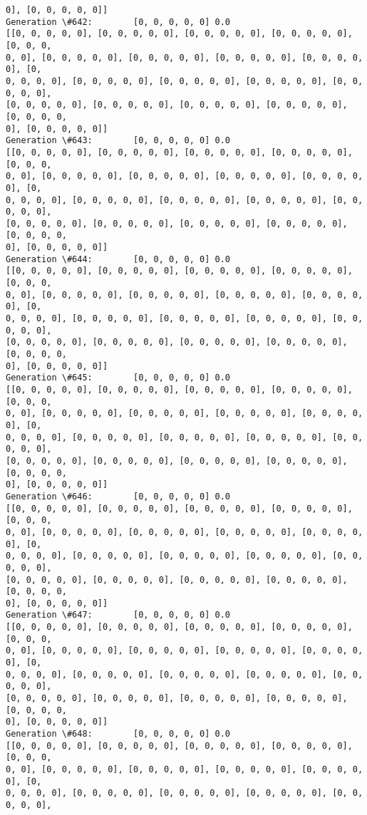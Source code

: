 \documentclass[11pt]{article}
\begin{document}
\begin{Verbatim}[commandchars=\\\{\}]
0], [0, 0, 0, 0, 0]]
Generation \#642:        [0, 0, 0, 0, 0] 0.0
[[0, 0, 0, 0, 0], [0, 0, 0, 0, 0], [0, 0, 0, 0, 0], [0, 0, 0, 0, 0], [0, 0, 0,
0, 0], [0, 0, 0, 0, 0], [0, 0, 0, 0, 0], [0, 0, 0, 0, 0], [0, 0, 0, 0, 0], [0,
0, 0, 0, 0], [0, 0, 0, 0, 0], [0, 0, 0, 0, 0], [0, 0, 0, 0, 0], [0, 0, 0, 0, 0],
[0, 0, 0, 0, 0], [0, 0, 0, 0, 0], [0, 0, 0, 0, 0], [0, 0, 0, 0, 0], [0, 0, 0, 0,
0], [0, 0, 0, 0, 0]]
Generation \#643:        [0, 0, 0, 0, 0] 0.0
[[0, 0, 0, 0, 0], [0, 0, 0, 0, 0], [0, 0, 0, 0, 0], [0, 0, 0, 0, 0], [0, 0, 0,
0, 0], [0, 0, 0, 0, 0], [0, 0, 0, 0, 0], [0, 0, 0, 0, 0], [0, 0, 0, 0, 0], [0,
0, 0, 0, 0], [0, 0, 0, 0, 0], [0, 0, 0, 0, 0], [0, 0, 0, 0, 0], [0, 0, 0, 0, 0],
[0, 0, 0, 0, 0], [0, 0, 0, 0, 0], [0, 0, 0, 0, 0], [0, 0, 0, 0, 0], [0, 0, 0, 0,
0], [0, 0, 0, 0, 0]]
Generation \#644:        [0, 0, 0, 0, 0] 0.0
[[0, 0, 0, 0, 0], [0, 0, 0, 0, 0], [0, 0, 0, 0, 0], [0, 0, 0, 0, 0], [0, 0, 0,
0, 0], [0, 0, 0, 0, 0], [0, 0, 0, 0, 0], [0, 0, 0, 0, 0], [0, 0, 0, 0, 0], [0,
0, 0, 0, 0], [0, 0, 0, 0, 0], [0, 0, 0, 0, 0], [0, 0, 0, 0, 0], [0, 0, 0, 0, 0],
[0, 0, 0, 0, 0], [0, 0, 0, 0, 0], [0, 0, 0, 0, 0], [0, 0, 0, 0, 0], [0, 0, 0, 0,
0], [0, 0, 0, 0, 0]]
Generation \#645:        [0, 0, 0, 0, 0] 0.0
[[0, 0, 0, 0, 0], [0, 0, 0, 0, 0], [0, 0, 0, 0, 0], [0, 0, 0, 0, 0], [0, 0, 0,
0, 0], [0, 0, 0, 0, 0], [0, 0, 0, 0, 0], [0, 0, 0, 0, 0], [0, 0, 0, 0, 0], [0,
0, 0, 0, 0], [0, 0, 0, 0, 0], [0, 0, 0, 0, 0], [0, 0, 0, 0, 0], [0, 0, 0, 0, 0],
[0, 0, 0, 0, 0], [0, 0, 0, 0, 0], [0, 0, 0, 0, 0], [0, 0, 0, 0, 0], [0, 0, 0, 0,
0], [0, 0, 0, 0, 0]]
Generation \#646:        [0, 0, 0, 0, 0] 0.0
[[0, 0, 0, 0, 0], [0, 0, 0, 0, 0], [0, 0, 0, 0, 0], [0, 0, 0, 0, 0], [0, 0, 0,
0, 0], [0, 0, 0, 0, 0], [0, 0, 0, 0, 0], [0, 0, 0, 0, 0], [0, 0, 0, 0, 0], [0,
0, 0, 0, 0], [0, 0, 0, 0, 0], [0, 0, 0, 0, 0], [0, 0, 0, 0, 0], [0, 0, 0, 0, 0],
[0, 0, 0, 0, 0], [0, 0, 0, 0, 0], [0, 0, 0, 0, 0], [0, 0, 0, 0, 0], [0, 0, 0, 0,
0], [0, 0, 0, 0, 0]]
Generation \#647:        [0, 0, 0, 0, 0] 0.0
[[0, 0, 0, 0, 0], [0, 0, 0, 0, 0], [0, 0, 0, 0, 0], [0, 0, 0, 0, 0], [0, 0, 0,
0, 0], [0, 0, 0, 0, 0], [0, 0, 0, 0, 0], [0, 0, 0, 0, 0], [0, 0, 0, 0, 0], [0,
0, 0, 0, 0], [0, 0, 0, 0, 0], [0, 0, 0, 0, 0], [0, 0, 0, 0, 0], [0, 0, 0, 0, 0],
[0, 0, 0, 0, 0], [0, 0, 0, 0, 0], [0, 0, 0, 0, 0], [0, 0, 0, 0, 0], [0, 0, 0, 0,
0], [0, 0, 0, 0, 0]]
Generation \#648:        [0, 0, 0, 0, 0] 0.0
[[0, 0, 0, 0, 0], [0, 0, 0, 0, 0], [0, 0, 0, 0, 0], [0, 0, 0, 0, 0], [0, 0, 0,
0, 0], [0, 0, 0, 0, 0], [0, 0, 0, 0, 0], [0, 0, 0, 0, 0], [0, 0, 0, 0, 0], [0,
0, 0, 0, 0], [0, 0, 0, 0, 0], [0, 0, 0, 0, 0], [0, 0, 0, 0, 0], [0, 0, 0, 0, 0],

\end{Verbatim}
\end{document}
